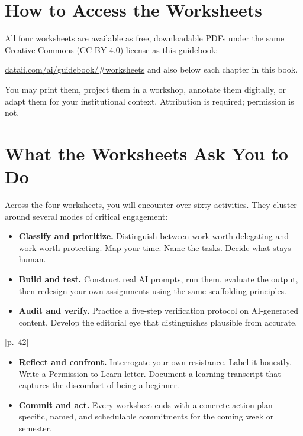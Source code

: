 \documentclass[
  letterpaper,
  DIV=11,
  numbers=noendperiod]{scrreprt}
\providecommand{\tightlist}{%
  \setlength{\itemsep}{0pt}\setlength{\parskip}{0pt}}
\begin{document}
\section{How to Access the
Worksheets}\label{how-to-access-the-worksheets}

All four worksheets are available as free, downloadable PDFs under the
same Creative Commons (CC BY 4.0) license as this guidebook:

\href{https://dataii.com/ai/guidebook/\#worksheets}{dataii.com/ai/guidebook/\#worksheets}
and also below each chapter in this book.

You may print them, project them in a workshop, annotate them digitally,
or adapt them for your institutional context. Attribution is required;
permission is not.

\section{What the Worksheets Ask You to
Do}\label{what-the-worksheets-ask-you-to-do}

Across the four worksheets, you will encounter over sixty activities.
They cluster around several modes of critical engagement:

\begin{itemize}
\tightlist
\item
  \textbf{Classify and prioritize.} Distinguish between work worth
  delegating and work worth protecting. Map your time. Name the tasks.
  Decide what stays human.
\item
  \textbf{Build and test.} Construct real AI prompts, run them, evaluate
  the output, then redesign your own assignments using the same
  scaffolding principles.
\item
  \textbf{Audit and verify.} Practice a five-step verification protocol
  on AI-generated content. Develop the editorial eye that distinguishes
  plausible from accurate.
\end{itemize}

{[}p.~42{]}

\begin{itemize}
\tightlist
\item
  \textbf{Reflect and confront.} Interrogate your own resistance. Label
  it honestly. Write a Permission to Learn letter. Document a learning
  transcript that captures the discomfort of being a beginner.
\item
  \textbf{Commit and act.} Every worksheet ends with a concrete action
  plan---specific, named, and schedulable commitments for the coming
  week or semester.
\end{itemize}
\end{document}

